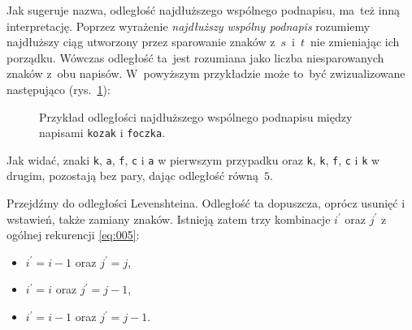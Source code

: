\documentclass{praca1}
\begin{document}
Jak sugeruje nazwa, odległość najdłuższego wspólnego podnapisu, ma~też inną interpretację. Poprzez wyrażenie \emph{najdłuższy wspólny podnapis} rozumiemy najdłuższy ciąg utworzony przez sparowanie znaków z~$s$~i~$t$~nie zmieniając ich porządku. Wówczas odległość ta~jest rozumiana jako liczba niesparowanych znaków z~obu napisów. W~powyższym przykładzie może to~być zwizualizowane następująco (rys.~\ref{rys:003}):
	
	

\begin{figure}[width=80pt]
\centering
{}
\cprotect\caption{Przykład odległości najdłuższego wspólnego podnapisu między napisami \verb|kozak| i \verb|foczka|.}\label{rys:003}
\end{figure}

Jak widać, znaki \verb|k|, \verb|a|, \verb|f|, \verb|c| i \verb|a| w pierwszym przypadku oraz \verb|k|, \verb|k|, \verb|f|, \verb|c| i \verb|k| w drugim, pozostają bez pary, dając odległość równą~$5$.





Przejdźmy do odległości Levenshteina. Odległość ta dopuszcza, oprócz usunięć i wstawień, także zamiany znaków. Istnieją zatem  trzy kombinacje $i^\prime$ oraz $j^\prime$ z ogólnej rekurencji \ref{eq:005}:
\begin{itemize}
\item $i^\prime = i - 1$ oraz $j^\prime = j$,
\item $i^\prime = i$ oraz $j^\prime = j - 1$,
\item $i^\prime = i - 1$ oraz $j^\prime = j - 1$.
\end{itemize}
\end{document}
